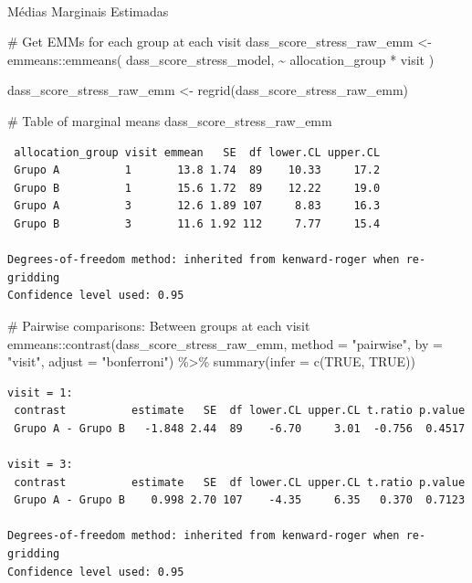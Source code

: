 \documentclass[
  letterpaper,
  DIV=11,
  numbers=noendperiod]{scrartcl}
\makeatletter
\let\oldparagraph\paragraph
\renewcommand{\paragraph}{
    \@ifstar
      \xxxParagraphStar
      \xxxParagraphNoStar
  }
\newcommand{\xxxParagraphStar}[1]{\oldparagraph*{#1}\mbox{}}
\newcommand{\xxxParagraphNoStar}[1]{\oldparagraph{#1}\mbox{}}
\newenvironment{Shaded}{\begin{snugshade}}{\end{snugshade}}
\newcommand{\AttributeTok}[1]{\textcolor[rgb]{0.40,0.45,0.13}{#1}}
\newcommand{\CommentTok}[1]{\textcolor[rgb]{0.37,0.37,0.37}{#1}}
\newcommand{\ConstantTok}[1]{\textcolor[rgb]{0.56,0.35,0.01}{#1}}
\newcommand{\FunctionTok}[1]{\textcolor[rgb]{0.28,0.35,0.67}{#1}}
\newcommand{\NormalTok}[1]{\textcolor[rgb]{0.00,0.23,0.31}{#1}}
\newcommand{\OtherTok}[1]{\textcolor[rgb]{0.00,0.23,0.31}{#1}}
\newcommand{\SpecialCharTok}[1]{\textcolor[rgb]{0.37,0.37,0.37}{#1}}
\newcommand{\StringTok}[1]{\textcolor[rgb]{0.13,0.47,0.30}{#1}}
\makeatother
\begin{document}
\paragraph{Médias Marginais
Estimadas}\label{muxe9dias-marginais-estimadas-24}

\begin{Shaded}
\begin{Highlighting}[]
\CommentTok{\# Get EMMs for each group at each visit}
\NormalTok{dass\_score\_stress\_raw\_emm }\OtherTok{\textless{}{-}}\NormalTok{ emmeans}\SpecialCharTok{::}\FunctionTok{emmeans}\NormalTok{(}
\NormalTok{    dass\_score\_stress\_model, }
    \SpecialCharTok{\textasciitilde{}}\NormalTok{ allocation\_group }\SpecialCharTok{*}\NormalTok{ visit}
\NormalTok{)}

\NormalTok{dass\_score\_stress\_raw\_emm }\OtherTok{\textless{}{-}} \FunctionTok{regrid}\NormalTok{(dass\_score\_stress\_raw\_emm)}

\CommentTok{\# Table of marginal means}
\NormalTok{dass\_score\_stress\_raw\_emm}
\end{Highlighting}
\end{Shaded}

\begin{verbatim}
 allocation_group visit emmean   SE  df lower.CL upper.CL
 Grupo A          1       13.8 1.74  89    10.33     17.2
 Grupo B          1       15.6 1.72  89    12.22     19.0
 Grupo A          3       12.6 1.89 107     8.83     16.3
 Grupo B          3       11.6 1.92 112     7.77     15.4

Degrees-of-freedom method: inherited from kenward-roger when re-gridding 
Confidence level used: 0.95 
\end{verbatim}

\begin{Shaded}
\begin{Highlighting}[]
\CommentTok{\# Pairwise comparisons: Between groups at each visit}
\NormalTok{emmeans}\SpecialCharTok{::}\FunctionTok{contrast}\NormalTok{(dass\_score\_stress\_raw\_emm, }\AttributeTok{method =} \StringTok{"pairwise"}\NormalTok{, }\AttributeTok{by =} \StringTok{"visit"}\NormalTok{, }\AttributeTok{adjust =} \StringTok{"bonferroni"}\NormalTok{) }\SpecialCharTok{\%\textgreater{}\%} \FunctionTok{summary}\NormalTok{(}\AttributeTok{infer =} \FunctionTok{c}\NormalTok{(}\ConstantTok{TRUE}\NormalTok{, }\ConstantTok{TRUE}\NormalTok{))}
\end{Highlighting}
\end{Shaded}

\begin{verbatim}
visit = 1:
 contrast          estimate   SE  df lower.CL upper.CL t.ratio p.value
 Grupo A - Grupo B   -1.848 2.44  89    -6.70     3.01  -0.756  0.4517

visit = 3:
 contrast          estimate   SE  df lower.CL upper.CL t.ratio p.value
 Grupo A - Grupo B    0.998 2.70 107    -4.35     6.35   0.370  0.7123

Degrees-of-freedom method: inherited from kenward-roger when re-gridding 
Confidence level used: 0.95 
\end{verbatim}
\end{document}
